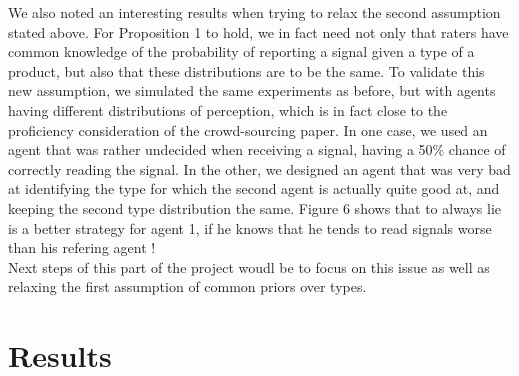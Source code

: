 \documentclass{scrartcl}
\begin{document}
We also noted an interesting results when trying to relax the second assumption stated above. For Proposition 1 to hold, we in fact need not only that  raters have common knowledge of the probability of reporting a signal given a type of a product, but also that these distributions are to be the same. To validate this new assumption, we simulated the same experiments as before, but with agents having different distributions of perception, which is in fact close to the proficiency consideration of the crowd-sourcing paper. In one case, we used an agent that was rather undecided when receiving a signal, having a 50\% chance of correctly reading the signal. In the other, we designed an agent that was very bad at identifying the type for which the second agent is actually quite good at, and keeping the second type distribution the same. Figure 6 shows that to always lie is a better strategy for agent 1, if he knows that he tends to read signals worse than his refering agent !\\ 

Next steps of this part of the project woudl be to focus on this issue as well as relaxing the first assumption of common priors over types.
\section{Results}
\end{document}
